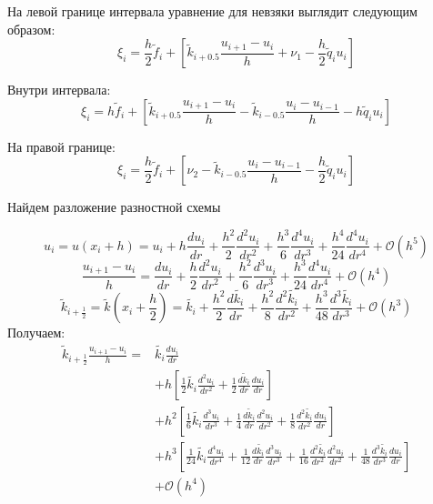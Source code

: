 На левой границе интервала уравнение для невзяки выглядит следующим образом:
\[
  \xi_i = \frac{h}{2} \tilde{f}_i + \left [ \tilde{k}_{i+0.5}\frac{u_{i+1}-u_i}{h} + \nu_1 - \frac{h}{2} \tilde{q}_i u_i \right ]
\]

Внутри интервала:
\[
  \xi_i = h \tilde{f}_i + \left [ \tilde{k}_{i+0.5}\frac{u_{i+1}-u_i}{h} - \tilde{k}_{i-0.5}\frac{u_{i} - u_{i-1}}{h} - h \tilde{q}_i u_i \right ]
\]

На правой границе:
\[
  \xi_i = \frac{h}{2} \tilde{f}_i + \left [ \nu_2 - \tilde{k}_{i-0.5}\frac{u_{i} - u_{i-1}}{h} -  \frac{h}{2} \tilde{q}_i u_i \right ]
\]

Найдем разложение разностной схемы

\[
  u_i = u(x_i + h) = u_i + h \frac{d u_i}{d r} + \frac{h^2 }{2} \frac{d^2 u_i}{d r^2}
  + \frac{h^3 }{6} \frac{d^4 u_i}{d r^3} + \frac{h^4 }{24} \frac{d^4 u_i}{d r^4} + \mathcal{O}(h^5)
\]
\[
  \frac{u_{i + 1} - u_{i}}{h} = \frac{d u_i}{dr} + \frac{h}{2} \frac{d^2 u_i}{dr^2} 
  + \frac{h^2}{6}\frac{d^3 u_i}{dr^3} + \frac{h^3}{24}\frac{d^4 u_i}{dr^4} + \mathcal{O}(h^4)
\]
\[
  \tilde{k}_{i+\frac{1}{2}} = \tilde{k}(x_i + \frac{h}{2}) = \tilde{k_i} + \frac{h^2 }{2}\frac{d \tilde{k_i}}{d r} + \frac{h^2 }{8}\frac{d^2 \tilde{k_i}}{d r^2}
  + \frac{h^3 }{48}\frac{d^3 \tilde{k_i}}{d r^3} + \mathcal{O}(h^3)
\]
Получаем:
\begin{align*}
  \tilde{k}_{i+\frac{1}{2}} \frac{u_{i + 1} - u_{i}}{h} = &\tilde{k_i} \frac{du_i}{dr} \\
  &+ h \left [ \frac{1}{2}\tilde{k_i} \frac{d^2 u_i}{d r^2} + \frac{1}{2}\frac{d \tilde{k}_i}{dr} \frac{d u_i}{d r} \right ] \\
  &+ h^2 \left [ \frac{1}{6}\tilde{k_i} \frac{d^3 u_i}{d r^3} + \frac{1}{4}\frac{d \tilde{k}_i}{dr} \frac{d^2 u_i}{d r^2} + \frac{1}{8}\frac{d^2 \tilde{k_i}}{dr^2} \frac{d u_i}{d r} \right ] \\
  &+ h^3 \left [ \frac{1}{24}\tilde{k_i} \frac{d^4 u_i}{d r^4} + \frac{1}{12}\frac{d \tilde{k_i}}{dr} \frac{d^3 u_i}{d r^3} + \frac{1}{16}\frac{d^2 \tilde{k_i}}{dr^2} \frac{d^2 u_i}{d r^2} + \frac{1}{48}\frac{d^3 \tilde{k_i}}{dr^3} \frac{d u_i}{d r}\right ] \\
  &+ \mathcal{O}(h^4)
\end{align*}

